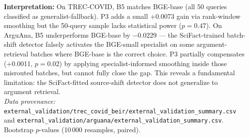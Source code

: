 \begin{table}[htbp]
\centering
\caption{External validation of Frozen B5/P3 SGAF on two BEIR datasets not used in transfer development. TREC-COVID (50 queries) and ArguAna (1406 queries) test generalization to biomedical IR and argument retrieval domains respectively. All SGAF variants use the SciFact-fitted batch-shift detector frozen and applied zero-shot. Cost is ``negligible'' --- B5 routing and P3 smoothing operate on already-computed top-100 lists with CPU-only post-retrieval overhead ($\sim$0.01\,ms and $\sim$0.001\,ms respectively).}
\label{tab:external-validation}
\small
{}

\vspace{0.5em}
\footnotesize
\textbf{Interpretation:} On TREC-COVID, B5 matches BGE-base (all 50 queries classified as generalist-fallback). P3 adds a small +0.0073 gain via rank-window smoothing but the 50-query sample lacks statistical power ($p=0.47$). On ArguAna, B5 underperforms BGE-base by $-$0.0229 --- the SciFact-trained batch-shift detector falsely activates the BGE-small specialist on some argument-retrieval batches where BGE-base is the correct choice. P3 partially compensates (+0.0011, $p=0.02$) by applying specialist-informed smoothing inside those misrouted batches, but cannot fully close the gap. This reveals a fundamental limitation: the SciFact-fitted source-shift detector does not generalize to argument retrieval.
\\
\textit{Data provenance:} \texttt{external\_validation/trec\_covid\_beir/external\_validation\_summary.csv} and \texttt{external\_validation/arguana/external\_validation\_summary.csv}. Bootstrap $p$-values (10\,000 resamples, paired).
\end{table}
